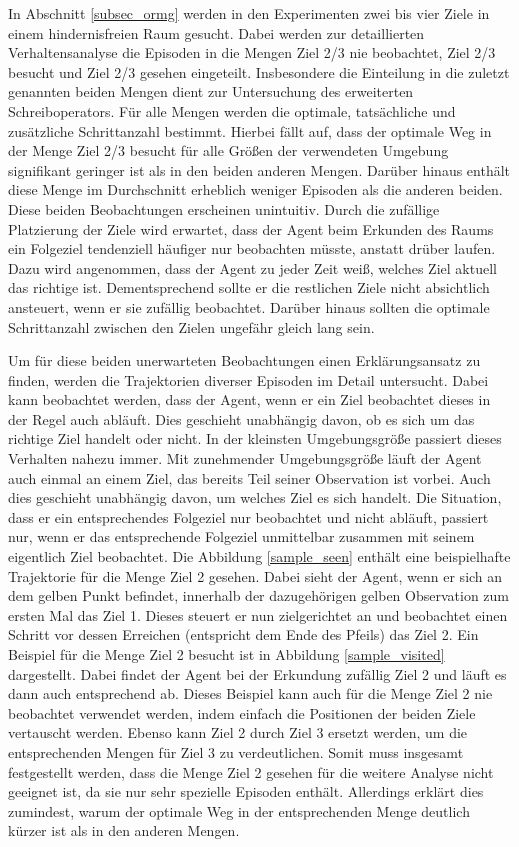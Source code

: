 In Abschnitt \ref{subsec_ormg} werden in den Experimenten zwei bis vier Ziele in einem hindernisfreien Raum gesucht. Dabei werden zur detaillierten Verhaltensanalyse die Episoden in die Mengen \glqq Ziel 2/3 nie beobachtet\grqq{}, \glqq Ziel 2/3 besucht\grqq{} und \glqq Ziel 2/3 gesehen\grqq{} eingeteilt. Insbesondere die Einteilung in die zuletzt genannten beiden Mengen dient zur Untersuchung des erweiterten Schreiboperators. Für alle Mengen werden die optimale, tatsächliche und zusätzliche Schrittanzahl bestimmt. Hierbei fällt auf, dass der optimale Weg in der Menge \glqq Ziel 2/3 besucht\grqq{} für alle Größen der verwendeten Umgebung signifikant geringer ist als in den beiden anderen Mengen. Darüber hinaus enthält diese Menge im Durchschnitt erheblich weniger Episoden als die anderen beiden. Diese beiden Beobachtungen erscheinen unintuitiv. Durch die zufällige Platzierung der Ziele wird erwartet, dass der Agent beim Erkunden des Raums ein Folgeziel tendenziell häufiger nur beobachten müsste, anstatt drüber laufen. Dazu wird angenommen, dass der Agent zu jeder Zeit weiß, welches Ziel aktuell das richtige ist. Dementsprechend sollte er die restlichen Ziele nicht absichtlich ansteuert, wenn er sie zufällig beobachtet. Darüber hinaus sollten die optimale Schrittanzahl zwischen den Zielen ungefähr gleich lang sein.

Um für diese beiden unerwarteten Beobachtungen einen Erklärungsansatz zu finden, werden die Trajektorien diverser Episoden im Detail untersucht. Dabei kann beobachtet werden, dass der Agent, wenn er ein Ziel beobachtet dieses in der Regel auch abläuft. Dies geschieht unabhängig davon, ob es sich um das richtige Ziel handelt oder nicht. In der kleinsten Umgebungsgröße passiert dieses Verhalten nahezu immer. Mit zunehmender Umgebungsgröße läuft der Agent auch einmal an einem Ziel, das bereits Teil seiner Observation ist vorbei. Auch dies geschieht unabhängig davon, um welches Ziel es sich handelt. Die Situation, dass er ein entsprechendes Folgeziel nur beobachtet und nicht abläuft, passiert nur, wenn er das entsprechende Folgeziel unmittelbar zusammen mit seinem eigentlich Ziel beobachtet. Die Abbildung \ref{sample_seen} enthält eine beispielhafte Trajektorie für die Menge \glqq Ziel 2 gesehen\grqq{}. Dabei sieht der Agent, wenn er sich an dem gelben Punkt befindet, innerhalb der dazugehörigen gelben Observation zum ersten Mal das Ziel 1. Dieses steuert er nun zielgerichtet an und beobachtet einen Schritt vor dessen Erreichen (entspricht dem Ende des Pfeils) das Ziel 2. Ein Beispiel für die Menge \glqq Ziel 2 besucht\grqq{} ist in Abbildung \ref{sample_visited} dargestellt. Dabei findet der Agent bei der Erkundung zufällig Ziel 2 und läuft es dann auch entsprechend ab. Dieses Beispiel kann auch für die Menge \glqq Ziel 2 nie beobachtet\grqq{} verwendet werden, indem einfach die Positionen der beiden Ziele vertauscht werden. Ebenso kann Ziel 2 durch Ziel 3 ersetzt werden, um die entsprechenden Mengen für Ziel 3 zu verdeutlichen. Somit muss insgesamt festgestellt werden, dass die Menge \glqq Ziel 2 gesehen\grqq{} für die weitere Analyse nicht geeignet ist, da sie nur sehr spezielle Episoden enthält. Allerdings erklärt dies zumindest, warum der optimale Weg in der entsprechenden Menge deutlich kürzer ist als in den anderen Mengen.

